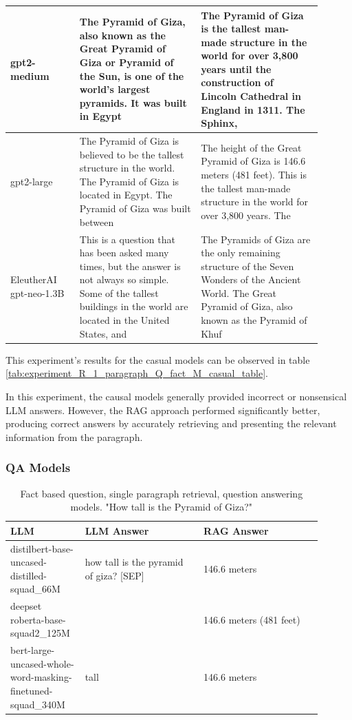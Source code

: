 \documentclass{wseas}
\begin{document}
\begin{table}[htbp]
\begin{tabular}{|p{0.20\linewidth}|p{0.35\linewidth}|p{0.35\linewidth}|}
    gpt2-medium & The Pyramid of Giza, also known as the Great Pyramid of Giza or Pyramid of the Sun, is one of the world's largest pyramids. It was built in Egypt & The Pyramid of Giza is the tallest man-made structure in the world for over 3,800 years until the construction of Lincoln Cathedral in England in 1311. The Sphinx, \\ \hline
    gpt2-large & The Pyramid of Giza is believed to be the tallest structure in the world. The Pyramid of Giza is located in Egypt. The Pyramid of Giza was built between & The height of the Great Pyramid of Giza is 146.6 meters (481 feet). This is the tallest man-made structure in the world for over 3,800 years. The \\ \hline
    EleutherAI gpt-neo-1.3B & This is a question that has been asked many times, but the answer is not always so simple. Some of the tallest buildings in the world are located in the United States, and & The Pyramids of Giza are the only remaining structure of the Seven Wonders of the Ancient World. The Great Pyramid of Giza, also known as the Pyramid of Khuf \\ \hline
  \end{tabular}
\end{table}

This experiment's results for the casual models can be observed in 
table \ref{tab:experiment_R_1_paragraph_Q_fact_M_casual_table}.

In this experiment, the causal models generally provided incorrect or
nonsensical LLM answers. However, the RAG approach performed
significantly better, producing correct answers by accurately retrieving
and presenting the relevant information from the paragraph.

\subsubsection{QA Models}
\begin{table}[htbp]
  \centering
  \caption{Fact based question, single paragraph retrieval, question answering models. "How tall is the Pyramid of Giza?"} %
  \label{tab:experiment_R_1_paragraph_Q_fact_M_QaModels_table}
  \begin{tabular}{|p{0.2\linewidth}|p{0.35\linewidth}|p{0.35\linewidth}|}
    \hline
    \textbf{LLM} & \textbf{LLM Answer} & \textbf{RAG Answer} \\ \hline
    distilbert-base-uncased-distilled-squad\_66M & how tall is the pyramid of giza? {[}SEP{]} & 146.6 meters \\ \hline
    deepset roberta-base-squad2\_125M &  & 146.6 meters (481 feet) \\ \hline
    bert-large-uncased-whole-word-masking-finetuned-squad\_340M & tall & 146.6 meters \\ \hline
  \end{tabular}
\end{table}
\end{document}
